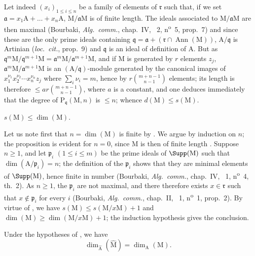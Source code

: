 Let indeed $(x_i)_{1\leq i\leq n}$ be a family of elements of $\mathfrak{r}$ such that, if we set $\mathfrak{a}=x_1\mathrm{A}+\ldots+x_n\mathrm{A}$, $\mathrm{M}/\mathfrak{a}\mathrm{M}$ is of finite length.
The ideals associated to $\mathrm{M}/\mathfrak{a}\mathrm{M}$ are then maximal (Bourbaki, \emph{Alg.~comm.}, chap.~IV, \textsection~2, n\textsuperscript{o}~5, prop.~7) and since these are the only prime ideals containing $\mathfrak{q}=\mathfrak{a}+(\mathfrak{r}\cap\operatorname{Ann}(\mathrm{M}))$, $\mathrm{A}/\mathfrak{q}$ is Artinian (\emph{loc.~cit.}, prop.~9) and $\mathfrak{q}$ is an ideal of definition of $\mathrm{A}$.
But as $\mathfrak{q}^m\mathrm{M}/\mathfrak{q}^{m+1}\mathrm{M}=\mathfrak{a}^m\mathrm{M}/\mathfrak{a}^{m+1}\mathrm{M}$, and if $\mathrm{M}$ is generated by $r$ elements $z_j$, $\mathfrak{a}^m\mathrm{M}/\mathfrak{a}^{m+1}\mathrm{M}$ is an $(\mathrm{A}/\mathfrak{q})$-module generated by the canonical images of $x_1^{\nu_1}x_2^{\nu_2}\cdots x_n^{\nu_n}z_j$ where $\sum_i\nu_i=m$, hence by $r\binom{m+n-1}{n-1}$ elements; its length is therefore $\leq ar\binom{m+n-1}{n-1}$, where $a$ is a constant, and one deduces immediately that the degree of $\mathrm{P}_\mathfrak{q}(\mathrm{M},n)$ is $\leq n$; whence $d(\mathrm{M})\leq s(\mathrm{M})$.

\begin{env}[16.2.3.4]
\label{0.16.2.3.4}
$s(\mathrm{M})\leq\dim(\mathrm{M})$.
\end{env}

Let us note first that $n=\dim(\mathrm{M})$ is finite by .
We argue by induction on $n$; the proposition is evident for $n=0$, since $\mathrm{M}$ is then of finite length .
Suppose $n\geq 1$, and let $\mathfrak{p}_i$ $(1\leq i\leq m)$ be the prime ideals of $\Supp(\mathrm{M})$ such that $\dim(\mathrm{A}/\mathfrak{p}_i)=n$; the definition of the $\mathfrak{p}_i$ shows that they are minimal elements of $\Supp(\mathrm{M})$, hence finite in number (Bourbaki, \emph{Alg.~comm.}, chap.~IV, \textsection~1, n\textsuperscript{o}~4, th.~2).
As $n\geq 1$, the $\mathfrak{p}_i$ are not maximal, and there therefore exists $x\in\mathfrak{r}$ such that $x\notin\mathfrak{p}_i$ for every $i$ (Bourbaki, \emph{Alg.~comm.}, chap.~II, \textsection~1, n\textsuperscript{o}~1, prop.~2).
By virtue of , we have $s(\mathrm{M})\leq s(\mathrm{M}/x\mathrm{M})+1$ and $\dim(\mathrm{M})\geq\dim(\mathrm{M}/x\mathrm{M})+1$; the induction hypothesis gives the conclusion.

\begin{corollary}[16.2.4]
\label{0.16.2.4}
Under the hypotheses of , we have
\begin{equation}
\label{0.16.2.4.1}
\tag{16.2.4.1}
  \dim_{\widehat{\mathrm{A}}}(\widehat{\mathrm{M}})=\dim_\mathrm{A}(\mathrm{M}).
\end{equation}
\end{corollary}

